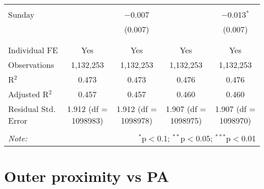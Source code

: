 \documentclass[
]{article}
\begin{document}
\begin{table}[!htbp]
{\begin{tabular}{@{\extracolsep{5pt}}lcccc}
  & & & & \\ 
 Sunday &  & $-$0.007 &  & $-$0.013$^{*}$ \\ 
  &  & (0.007) &  & (0.007) \\ 
  & & & & \\ 
\hline \\[-1.8ex] 
Individual FE & Yes & Yes & Yes & Yes \\ 
Observations & 1,132,253 & 1,132,253 & 1,132,253 & 1,132,253 \\ 
R$^{2}$ & 0.473 & 0.473 & 0.476 & 0.476 \\ 
Adjusted R$^{2}$ & 0.457 & 0.457 & 0.460 & 0.460 \\ 
Residual Std. Error & 1.912 (df = 1098983) & 1.912 (df = 1098978) & 1.907 (df = 1098975) & 1.907 (df = 1098970) \\ 
\hline 
\hline \\[-1.8ex] 
\textit{Note:}  & \multicolumn{4}{r}{$^{*}$p$<$0.1; $^{**}$p$<$0.05; $^{***}$p$<$0.01} \\ 
\end{tabular}
} 
\end{table} 
\newpage
\section{Outer proximity vs PA}
\end{document}
